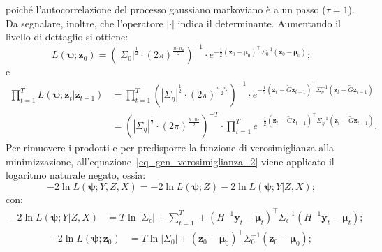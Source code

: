 poiché l'autocorrelazione del processo gaussiano markoviano è a un passo ($\tau = 1$). Da segnalare, inoltre, che l'operatore $|\cdot|$ indica il determinante. Aumentando il livello di dettaglio si ottiene:
\begin{equation}
	L(\boldsymbol{\psi}; \mathbf{z}_0) = \left(|\Sigma_0|^\frac{1}{2}\cdot\left(2\pi\right)^\frac{n\cdot n_z}{2}\right)^{-1}\cdot e^{-\frac{1}{2}\left(\mathbf{z}_0 - \boldsymbol{\mu}_0 \right)^\top\Sigma_0^{-1}\left(\mathbf{z}_0 - \boldsymbol{\mu}_0 \right)};
\end{equation}
e
\begin{equation}
	\begin{split}
		\prod_{t=1}^{T}L(\boldsymbol{\psi};\mathbf{z}_t|\mathbf{z}_{t-1}) & = \prod_{t=1}^{T}\left(|\Sigma_\eta|^\frac{1}{2}\cdot\left(2\pi\right)^\frac{n\cdot n_z}{2}\right)^{-1}\cdot e^{-\frac{1}{2}\left(\mathbf{z}_t - \tilde{G}\boldsymbol{z}_{t-1} \right)^\top\Sigma_\eta^{-1}\left(\mathbf{z}_t - \tilde{G}\boldsymbol{z}_{t-1} \right)}\\
		& = \left(|\Sigma_\eta|^\frac{1}{2}\cdot\left(2\pi\right)^\frac{n\cdot n_z}{2}\right)^{-T}\cdot\prod_{t=1}^{T}e^{-\frac{1}{2}\left(\mathbf{z}_t - \tilde{G}\boldsymbol{z}_{t-1} \right)^\top\Sigma_\eta^{-1}\left(\mathbf{z}_t - \tilde{G}\boldsymbol{z}_{t-1} \right)}.
	\end{split}
\end{equation}
Per rimuovere i prodotti e per predisporre la funzione di verosimiglianza alla minimizzazione, all'equazione~\ref{eq_gen_verosimiglianza_2} viene applicato il logaritmo naturale negato, ossia:
\begin{equation}
	-2\ln L(\boldsymbol{\psi}; Y, Z, X) = -2\ln L(\boldsymbol{\psi}; Z) - 2\ln L(\boldsymbol{\psi}; Y|Z,X);
\end{equation}
con:
\begin{equation}
	\begin{split}
		- 2\ln L(\boldsymbol{\psi}; Y|Z,X) & = T\ln|\Sigma_\epsilon| +\sum_{t=1}^{T}+\left(H^{-1}\mathbf{y}_t - \boldsymbol{\mu}_t\right)^\top\Sigma_\epsilon^{-1}\left(H^{-1}\mathbf{y}_t - \boldsymbol{\mu}_t\right);
	\end{split}
\end{equation}
\begin{equation}
	\begin{split}
		- 2\ln L(\boldsymbol{\psi}; \mathbf{z}_0) & = T\ln|\Sigma_0| + \left(\mathbf{z}_0 - \boldsymbol{\mu}_0 \right)^\top\Sigma_0^{-1}\left(\mathbf{z}_0 - \boldsymbol{\mu}_0 \right);
	\end{split}
\end{equation}
